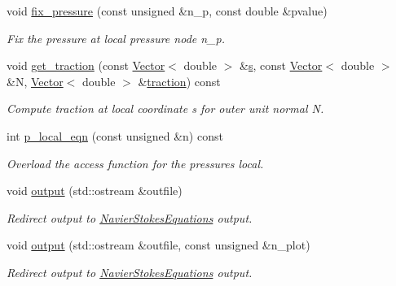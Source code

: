 \begin{DoxyCompactItemize}
void \hyperlink{classoomph_1_1GeneralisedNewtonianAxisymmetricQTaylorHoodElement_ad78373deac9f03bc187be73f207f783c}{fix\+\_\+pressure} (const unsigned \&n\+\_\+p, const double \&pvalue)
\begin{DoxyCompactList}\small\item\em Fix the pressure at local pressure node n\+\_\+p. \end{DoxyCompactList}\item 
void \hyperlink{classoomph_1_1GeneralisedNewtonianAxisymmetricQTaylorHoodElement_aab966919743195af6d11a7e986c6df49}{get\+\_\+traction} (const \hyperlink{classoomph_1_1Vector}{Vector}$<$ double $>$ \&\hyperlink{cfortran_8h_ab7123126e4885ef647dd9c6e3807a21c}{s}, const \hyperlink{classoomph_1_1Vector}{Vector}$<$ double $>$ \&N, \hyperlink{classoomph_1_1Vector}{Vector}$<$ double $>$ \&\hyperlink{classoomph_1_1GeneralisedNewtonianAxisymmetricNavierStokesEquations_a8df8becab07205931682772c05d1de1c}{traction}) const
\begin{DoxyCompactList}\small\item\em Compute traction at local coordinate s for outer unit normal N. \end{DoxyCompactList}\item 
int \hyperlink{classoomph_1_1GeneralisedNewtonianAxisymmetricQTaylorHoodElement_a668055f81b262fd80821d1cecce66d0f}{p\+\_\+local\+\_\+eqn} (const unsigned \&n) const
\begin{DoxyCompactList}\small\item\em Overload the access function for the pressure\textquotesingle{}s local. \end{DoxyCompactList}\item 
void \hyperlink{classoomph_1_1GeneralisedNewtonianAxisymmetricQTaylorHoodElement_a2f949241b86234f5681385d35ee0716d}{output} (std\+::ostream \&outfile)
\begin{DoxyCompactList}\small\item\em Redirect output to \hyperlink{classoomph_1_1NavierStokesEquations}{Navier\+Stokes\+Equations} output. \end{DoxyCompactList}\item 
void \hyperlink{classoomph_1_1GeneralisedNewtonianAxisymmetricQTaylorHoodElement_a523d450f7d50883425f33c9858ae6452}{output} (std\+::ostream \&outfile, const unsigned \&n\+\_\+plot)
\begin{DoxyCompactList}\small\item\em Redirect output to \hyperlink{classoomph_1_1NavierStokesEquations}{Navier\+Stokes\+Equations} output. \end{DoxyCompactList}\item 

\end{DoxyCompactItemize}
